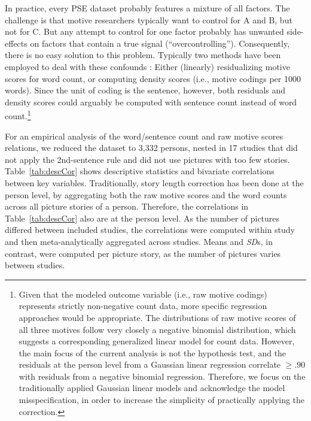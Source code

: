 \documentclass[man,a4paper,mask]{apa6}\usepackage[]{graphicx}\usepackage[]{color}
\begin{document}
In practice, every PSE dataset probably features a mixture of all factors. The challenge is that motive researchers typically want to control for A and B, but not for C. But any attempt to control for one factor probably has unwanted side-effects on factors that contain a true signal (``overcontrolling''). Consequently, there is no easy solution to this problem. Typically two methods have been employed to deal with these confounds \parencite{schultheiss_MeasuringImplicitMotives_2007}: Either (linearly) residualizing motive scores for word count, or computing density scores (i.e., motive codings per 1000 words). Since the unit of coding is the sentence, however, both residuals and density scores could arguably be computed with sentence count instead of word count.\footnote{Given that the modeled outcome variable (i.e., raw motive codings) represents strictly non-negative count data, more specific regression approaches would be appropriate. The distributions of raw motive scores of all three motives follow very closely a negative binomial distribution, which suggests a corresponding generalized linear model for count data. However, the main focus of the current analysis is not the hypothesis test, and the residuals at the person level from a Gaussian linear regression correlate $\geq .90$ with residuals from a negative binomial regression. Therefore, we focus on the traditionally applied Gaussian linear models and acknowledge the model misspecification, in order to increase the simplicity of practically applying the correction.}

For an empirical analysis of the word/sentence count and raw motive scores relations, we reduced the dataset to 3,332 persons, nested in 17 studies that did not apply the 2nd-sentence rule and did not use pictures with too few stories. 
Table~\ref{tab:descCor} shows descriptive statistics and bivariate correlations between key variables. 
Traditionally, story length correction has been done at the person level, by aggregating both the raw motive scores and the word counts across all picture stories of a person. 
Therefore, the correlations in Table~\ref{tab:descCor} also are at the person level. 
As the number of pictures differed between included studies, the correlations were computed within study and then meta-analytically aggregated across studies. Means and \emph{SD}s, in contrast, were computed per picture story, as the number of pictures varies between studies. 
\end{document}
